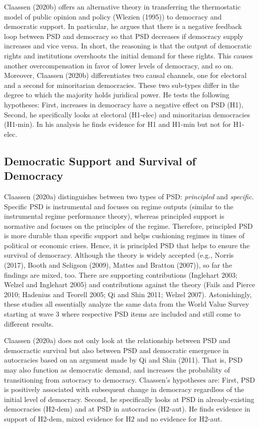 \documentclass[12pt,english,a4paper,oneside]{article}
\theoremstyle{definition}
\theoremstyle{definition}
\theoremstyle{definition}
\theoremstyle{definition}
\theoremstyle{remark}
\begin{document}
Claassen (2020b) offers an alternative theory in transferring the thermostatic model of public opinion and policy (Wlezien (1995)) to democracy and democratic support. In particular, he argues that there is a negative feedback loop between PSD and democracy so that PSD decreases if democracy supply increases and vice versa. In short, the reasoning is that the output of democratic rights and institutions overshoots the initial demand for these rights. This causes another overcompensation in favor of lower levels of democracy, and so on. Moreover, Claassen (2020b) differentiates two causal channels, one for electoral and a second for minoritarian democracies. These two sub-types differ in the degree to which the majority holds juridical power. He tests the following hypotheses: First, increases in democracy have a negative effect on PSD (H1), Second, he specifically looks at electoral (H1-elec) and minoritarian democracies (H1-min). In his analysis he finds evidence for H1 and H1-min but not for H1-elec.

\hypertarget{democratic-support-and-survival-of-democracy}{%
\subsection{Democratic Support and Survival of Democracy}\label{democratic-support-and-survival-of-democracy}}

Claassen (2020a) distinguishes between two types of PSD: \emph{principled} and \emph{specific}. Specific PSD is instrumental and focuses on regime outputs (similar to the instrumental regime performance theory), whereas principled support is normative and focuses on the principles of the regime. Therefore, principled PSD is more durable than specific support and helps cushioning regimes in times of political or economic crises. Hence, it is principled PSD that helps to ensure the survival of democracy. Although the theory is widely accepted (e.g., Norris (2017), Booth and Seligson (2009), Mattes and Bratton (2007)), so far the findings are mixed, too. There are supporting contributions (Inglehart 2003; Welzel and Inglehart 2005) and contributions against the theory (Fails and Pierce 2010; Hadenius and Teorell 2005; Qi and Shin 2011; Welzel 2007). Astonishingly, these studies all essentially analyze the same data from the World Value Survey starting at wave 3 where respective PSD items are included and still come to different results.

Claassen (2020a) does not only look at the relationship between PSD and democractic survival but also between PSD and democratic emergence in autocracies based on an argument made by Qi and Shin (2011). That is, PSD may also function as democratic demand, and increases the probability of transitioning from autocracy to democracy. Claassen's hypotheses are: First, PSD is positively associated with subsequent change in democracy regardless of the initial level of democracy. Second, he specifically looks at PSD in already-existing democracies (H2-dem) and at PSD in autocracies (H2-aut). He finds evidence in support of H2-dem, mixed evidence for H2 and no evidence for H2-aut.
\end{document}
